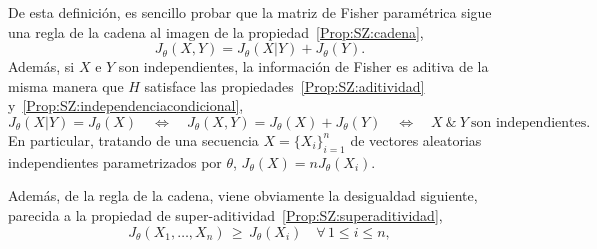 De esta definici\'on,  es sencillo probar que la matriz  de Fisher param\'etrica
sigue una regla de la cadena al imagen de la propiedad~\ref{Prop:SZ:cadena},
%
\[
J_\theta(X,Y) = J_\theta(X|Y) + J_\theta(Y).
\]
%
Adem\'as, si $X$ e $Y$ son independientes, la informaci\'on de Fisher es aditiva
de la  misma manera  que $H$ satisface  las propiedades~\ref{Prop:SZ:aditividad}
y~\ref{Prop:SZ:independenciacondicional}, \ie
%
\[
J_\theta(X|Y)  =   J_\theta(X)  \quad  \Leftrightarrow  \quad   J_\theta(X,Y)  =
J_\theta(X) + J_\theta(Y) \quad \Leftrightarrow \quad  X \: \& \: Y \: \mbox{son
independientes.}
\]
%
En particular,  tratando de una  secuencia $X =  \{ X_i \}_{i=1}^n$  de vectores
aleatorias  independientes   parametrizados  por  $\theta$,   $J_\theta(X)  =  n
J_\theta(X_i)$.

Adem\'as, de la  regla de la cadena, viene obviamente  la desigualdad siguiente,
parecida a la propiedad de super-aditividad~\ref{Prop:SZ:superaditividad},
%
\[
J_\theta(X_1,\ldots,X_n) \, \ge \,  J_\theta(X_i) \quad \forall \, 1 \le i \le n,
\]
%
